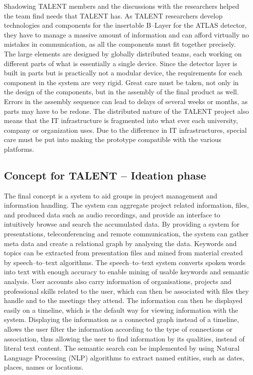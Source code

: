 \documentclass[english,12pt,a4paper,pdftex]{article}
\begin{document}
Shadowing TALENT members and the discussions with the researchers helped the team find needs that TALENT has. As TALENT researchers develop technologies and components for the insertable B--Layer for the ATLAS detector, they have to manage a massive amount of information and can afford virtually no mistakes in communication, as all the components must fit together precisely. The large elements are designed by globally distributed teams, each working on different parts of what is essentially a single device. Since the detector layer is built in parts but is practically not a modular device, the requirements for each component in the system are very rigid. Great care must be taken, not only in the design of the components, but in the assembly of the final product as well. Errors in the assembly sequence can lead to delays of several weeks or months, as parts may have to be redone. The distributed nature of the TALENT project also means that the IT infrastructure is fragmented into what ever each university, company or organization uses. Due to the difference in IT infrastructures, special care must be put into making the prototype compatible with the various platforms. 


\subsection{Concept for TALENT -- Ideation phase}


The final concept is a system to aid groups in project management and information handling. The system can aggregate project related information, files, and produced data such as audio recordings, and provide an interface to intuitively browse and search the accumulated data. By providing a system for presentations, teleconferencing and remote communication, the system can gather meta data and create a relational graph by analysing the data. Keywords and topics can be extracted from presentation files and mined from material created by speech--to--text algorithms. The speech--to--text system converts spoken words into text with enough accuracy to enable mining of usable keywords and semantic analysis. User accounts also carry information of organisations, projects and professional skills related to the user, which can then be associated with files they handle and to the meetings they attend. The information can then be displayed easily on a timeline, which is the default way for viewing information with the system. Displaying the information as a connected graph instead of a timeline, allows the user filter the information according to the type of connections or association, thus allowing the user to find information by its qualities, instead of literal text content. The semantic search can be implemented by using Natural Language Processing (NLP) algorithms to extract named entities, such as dates, places, names or locations.
\end{document}
